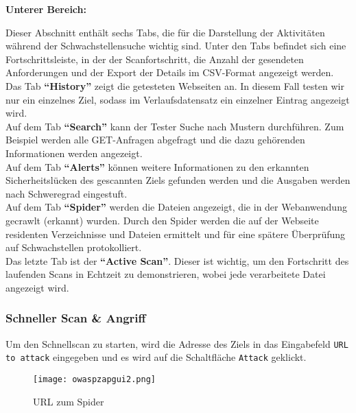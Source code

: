 \begin{flushleft}
	\textbf{Unterer Bereich:}\\
\end{flushleft}
Dieser Abschnitt enthält sechs Tabs, die für die Darstellung der Aktivitäten während der Schwachstellensuche wichtig sind. Unter den Tabs befindet sich eine Fortschrittsleiste, in der der Scanfortschritt, die Anzahl der gesendeten Anforderungen und der Export der Details im CSV-Format angezeigt werden.\\

Das Tab \textbf{"`History"'} zeigt die getesteten Webseiten an. In diesem Fall testen wir nur ein einzelnes Ziel, sodass im Verlaufsdatensatz ein einzelner Eintrag angezeigt wird.\\

Auf dem Tab \textbf{"`Search"'} kann der Tester Suche nach Mustern durchführen. Zum Beispiel werden alle GET-Anfragen abgefragt und die dazu gehörenden Informationen werden angezeigt.\\

Auf dem Tab \textbf{"`Alerts"'} können weitere Informationen zu den erkannten Sicherheitslücken des gescannten Ziels gefunden werden und die Ausgaben werden nach Schweregrad eingestuft.\\

Auf dem Tab \textbf{"`Spider"'} werden die Dateien angezeigt, die in der Webanwendung gecrawlt (erkannt) wurden. Durch den Spider werden die auf der Webseite residenten Verzeichnisse und Dateien ermittelt und für eine spätere Überprüfung auf Schwachstellen protokolliert.\\

Das letzte Tab ist der \textbf{"`Active Scan"'}. Dieser ist wichtig, um den Fortschritt des laufenden Scans in Echtzeit zu demonstrieren, wobei jede verarbeitete Datei angezeigt wird.\\

\subsubsection{Schneller Scan \& Angriff}

Um den Schnellscan zu starten, wird die Adresse des Ziels in das Eingabefeld \texttt{URL to attack} eingegeben und es wird auf die Schaltfläche \texttt{Attack} geklickt.

\begin{figure}[h]
	\centering
	\texttt{[image: owaspzapgui2.png]}
	\caption{URL zum Spider}
	\label{quickscan2}
\end{figure}

